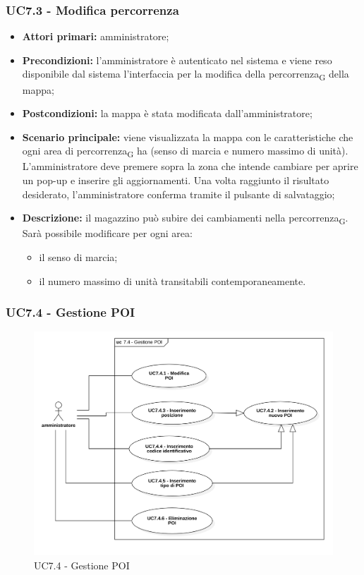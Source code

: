 \subsubsection{UC7.3 - Modifica percorrenza}
\begin{itemize}
	\item 	\textbf{Attori primari:} amministratore;
	\item 	\textbf{Precondizioni:}  l'amministratore è autenticato nel sistema e viene reso disponibile dal sistema l'interfaccia per la modifica della \gls{percorrenza}\textsubscript{G} della mappa;
	\item 	\textbf{Postcondizioni:} la mappa è stata modificata dall'amministratore;
	\item 	\textbf{Scenario principale:} viene visualizzata la mappa con le caratteristiche che ogni area di \gls{percorrenza}\textsubscript{G} ha (senso di marcia e numero massimo di unità). L'amministratore deve premere sopra la zona che intende cambiare per aprire un pop-up e inserire gli aggiornamenti. Una volta raggiunto il risultato desiderato, l'amministratore conferma tramite il pulsante di salvataggio;
	\item 	\textbf{Descrizione:} il magazzino può subire dei cambiamenti nella \gls{percorrenza}\textsubscript{G}. Sarà possibile modificare per ogni area:
	\begin{itemize}
		\item il senso di marcia;
		\item il numero massimo di unità transitabili contemporaneamente.
	\end{itemize}
\end{itemize}

\subsubsection{UC7.4 - Gestione POI}

\begin{figure}[H]
	\centering
	\includegraphics[scale=0.52]{res/images/uc7-4.png}
	\caption{UC7.4 - Gestione POI}
\end{figure}

